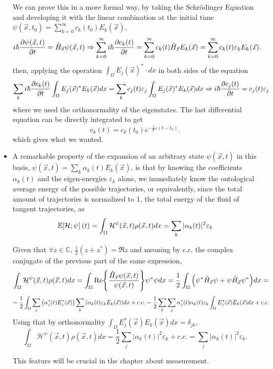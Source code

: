 \documentclass[11pt, a4paper]{article} %
\newcommand{\C}{\mathbb{C}}
\newcommand{\h}{\mathcal{H}}
\newcommand{\E}{\mathbb{E}}
\DeclareRobustCommand{\mybox}[2][gray!10]{%
\begin{tcolorbox}[   %
        left=0.2cm,
        right=0.2cm,
        top=0.15cm,
        bottom=0.15cm,
        colback=#1,
        colframe=#1,
        width=\dimexpr\textwidth\relax, 
        enlarge left by=0mm,
        boxsep=5pt,
        arc=0pt,outer arc=0pt,
        ]
        #2
\end{tcolorbox}
}
\begin{document}
\begin{itemize}
\mybox{
We can prove this in a more formal way, by taking the Schrödinger Equation and developing it with the linear combination at the initial time $\psi(\vec{x},t_0)=\sum_{k=0}^\infty c_k(t_0)E_k(\vec{x})$,
\begin{equation}
i\hbar\pdv{\psi(\vec{x},t)}{t}=\hat{H}_{\vec{x}}\psi(\vec{x},t)\Rightarrow \sum_{k=0}^\infty	i\hbar \pdv{c_k(t)}{t}=\sum_{k=0}^\infty c_k(t)\hat{H}_{\vec{x}}E_k(\vec{x})=\sum_{k=0}^\infty c_k(t)\varepsilon_k E_k(\vec{x}).
\end{equation}
then, applying the operation $\int_{\Omega}E_j(\vec{x})^*\cdot dx$ in both sides of the equation
\begin{equation}
\sum_k i\hbar \pdv{c_k(t)}{t} \int_\Omega E_j(\vec{x})^*E_k(\vec{x}) dx= \sum_k c_j(t)\varepsilon_j \int_\Omega E_j(\vec{x})^* E_k(\vec{x}) dx\Rightarrow i\hbar \pdv{c_j(t)}{t}= c_j(t)\varepsilon_j
\end{equation}
where we used the orthonormality of the eigenstates. The last differential equation can be directly integrated to get
\begin{equation}
c_k(t)=c_k(t_0)e^{-\frac{i}{\hbar}\varepsilon(t-t_0)}.
\end{equation}
which gives what we wanted.
}

\item A remarkable property of the expansion of an arbitrary state $\psi(\vec{x},t)$ in this basis, $\psi(\vec{x},t)=\sum_{k} \alpha_k(t)E_k(\vec{x})$, is that by knowing the coefficients $\alpha_k(t)$ and the eigen-energies $\varepsilon_k$ alone, we immediately know the ontological average energy of the possible trajectories, or equivalently, since the total amount of trajectories is normalized to 1, the total energy of the fluid of tangent trajectories, as
\begin{equation}
\E\qty[\h; \psi](t)=\int_\Omega \h^\psi(\vec{x},t)\rho(\vec{x},t) dx = \sum_k |\alpha_k(t)|^2 \varepsilon_k
\end{equation}
\mybox{
Given that $\forall z\in\C$, $\frac{1}{2}(z+z^*)=\Re{z}$ and meaning by $c.c.$ the complex conjugate of the previous part of the same expression,
\begin{equation}
\int_\Omega \h^\psi(\vec{x},t)\rho(\vec{x},t) dx =\int_\Omega \Re{\frac{\hat{H}_{\vec{x}}\psi(\vec{x},t)}{\psi(\vec{x},t)}} \psi^*\psi dx =\frac{1}{2}\int_\Omega \qty(\psi^*\hat{H}_{\vec{x}}\psi+\psi\hat{H}_{\vec{x}}\psi^*)dx=
\end{equation}
$$
= \frac{1}{2}\int_\Omega\sum_j\qty(\alpha_j^*(t)E^*_j(\vec{x}))\sum_k\qty(\alpha_k(t)\varepsilon_k E_k(\vec{x})) dx+c.c.=\frac{1}{2}\sum_k\sum_j\alpha_j^*(t)\alpha_k(t)\varepsilon_k\int_{\Omega}E^*_j(\vec{x})E_k(\vec{x})dx +c.c.
$$
Using that by orthonormality $\int_\Omega E_j^*(\vec{x})E_k(\vec{x})dx=\delta_{jk}$,
\begin{equation}
\int_\Omega \h^\psi(\vec{x},t)\rho(\vec{x},t) dx =\frac{1}{2}\sum_j |\alpha_k(t)|^2\varepsilon_k+c.c.=\sum_j |\alpha_k(t)|^2\varepsilon_k.
\end{equation}
}
This feature will be crucial in the chapter about measurement.
\end{itemize}
\end{document}
